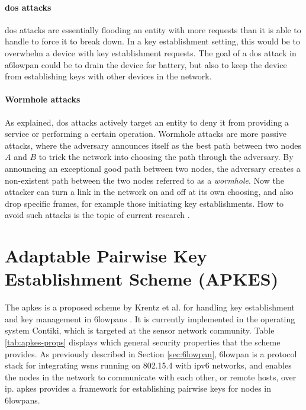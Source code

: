 \paragraph{\gls{dos} attacks}

\gls{dos} attacks are essentially flooding an entity with more requests than it is able to handle to force it to break down. In a key establishment setting, this would be to overwhelm a device with key establishment requests. The goal of a \gls{dos} attack in a\gls{6lowpan} could be to drain the device for battery, but also to keep the device from establishing keys with other devices in the network.

\paragraph{Wormhole attacks}

As explained, \gls{dos} attacks actively target an entity to deny it from providing a service or performing a certain operation. Wormhole attacks are more passive attacks, where the adversary announces itself as the best path between two nodes $A$ and $B$ to trick the network into choosing the path through the adversary. By announcing an exceptional good path between two nodes, the adversary creates a non-existent path between the two nodes referred to as a \emph{wormhole}. Now the attacker can turn a link in the network on and off at its own choosing, and also drop specific frames, for example those initiating key establishments. How to avoid such attacks is the topic of current research \cite{krentz20146lowpan}.

\newpage

\section{Adaptable Pairwise Key Establishment Scheme (APKES)}

The \gls{apkes} is a proposed scheme by Krentz et al. for handling key establishment and key management in \gls{6lowpan}s \cite{krentz20136lowpan}. It is currently implemented in the operating system Contiki, which is targeted at the sensor network community. Table \ref{tab:apkes-props} displays which general security properties that the scheme provides. As previously described in Section \ref{sec:6lowpan}, \gls{6lowpan} is a protocol stack for integrating \gls{wsn}s running on 802.15.4 with \gls{ip}v6 networks, and enables the nodes in the network to communicate with each other, or remote hosts, over \gls{ip}. \gls{apkes} provides a framework for establishing pairwise keys for nodes in \gls{6lowpan}s.

